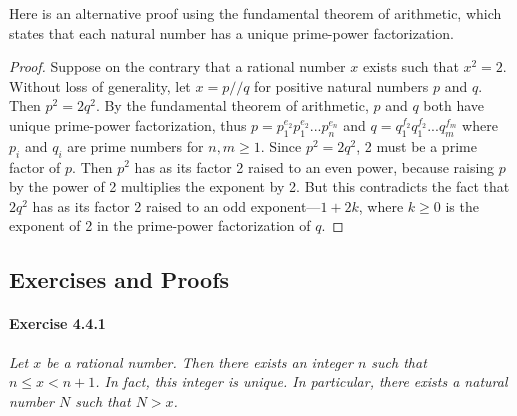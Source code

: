 \documentclass{article}
\begin{document}
Here is an alternative proof using the fundamental theorem of arithmetic, which states that each natural number has a unique prime-power factorization.

\begin{proof}
Suppose on the contrary that a rational number $x$ exists such that $x^2 = 2$. Without loss of generality, let $x = p//q$ for positive natural numbers $p$ and $q$. Then $p^2 = 2q^2$. By the fundamental theorem of arithmetic, $p$ and $q$ both have unique prime-power factorization, thus $p = p_1^{e_2}p_1^{e_2}...p_n^{e_n}$ and $q = q_1^{f_2}q_1^{f_2}...q_m^{f_m}$ where $p_i$ and $q_i$ are prime numbers for $n,m \geq 1$. Since $p^2 = 2q^2$, 2 must be a prime factor of $p$. Then $p^2$ has as its factor 2 raised to an even power, because raising $p$ by the power of 2 multiplies the exponent by 2. But this contradicts the fact that $2q^2$ has as its factor 2 raised to an odd exponent---$1 + 2k$, where $k \geq 0$ is the exponent of 2 in the prime-power factorization of $q$.
\end{proof}

\subsection*{Exercises and Proofs}




\paragraph{Exercise 4.4.1} \textit{Let $x$ be a rational number. Then there exists an integer $n$ such that $n \leq x < n + 1$. In fact, this integer is unique. In particular, there exists a natural number $N$ such that $N > x$.}
\end{document}
